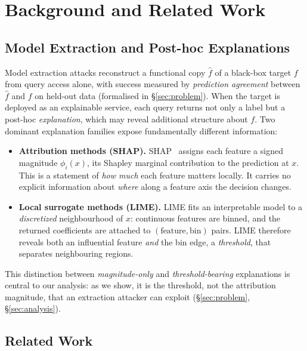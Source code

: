 \documentclass[sigconf,anonymous,review]{acmart}
\begin{document}
\section{Background and Related Work}
\label{sec:background}

\subsection{Model Extraction and Post-hoc Explanations}
\label{subsec:prelim}

Model extraction attacks reconstruct a functional copy $\hat{f}$ of a black-box
target $f$ from query access alone, with success measured by \emph{prediction
agreement} between $\hat{f}$ and $f$ on held-out data (formalised in
\S\ref{sec:problem}). When the target is deployed as an explainable service, each
query returns not only a label but a post-hoc \emph{explanation}, which may reveal
additional structure about $f$. Two dominant explanation families expose
fundamentally different information:

\begin{itemize}
  \item \textbf{Attribution methods (SHAP).} SHAP~\cite{lundberg2017shap} assigns
  each feature a signed magnitude $\phi_i(x)$, its Shapley marginal contribution
  to the prediction at $x$. This is a statement of \emph{how much} each feature matters locally. It carries no explicit information about \emph{where} along a
  feature axis the decision changes.
  \item \textbf{Local surrogate methods (LIME).} LIME fits an interpretable model
  to a \emph{discretized} neighbourhood of $x$: continuous features are binned, and
  the returned coefficients are attached to $(\text{feature}, \text{bin})$ pairs.
  LIME therefore reveals both an influential feature \emph{and} the bin edge, a \emph{threshold}, that separates neighbouring regions.
\end{itemize}

This distinction between \emph{magnitude-only} and \emph{threshold-bearing}
explanations is central to our analysis: as we show, it is the threshold, not the
attribution magnitude, that an extraction attacker can exploit
(\S\ref{sec:problem}, \S\ref{sec:analysis}).

\subsection{Related Work}
\label{subsec:related}
\end{document}
